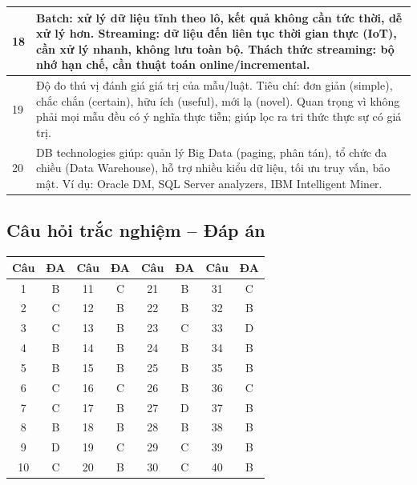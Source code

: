 \documentclass[10pt]{article}
\begin{document}
\begin{singlespace}
\begin{longtable}{|p{}|p{}|}
18 & Batch: xử lý dữ liệu tĩnh theo lô, kết quả không cần tức thời, dễ xử lý hơn. Streaming: dữ liệu đến liên tục thời gian thực (IoT), cần xử lý nhanh, không lưu toàn bộ. Thách thức streaming: bộ nhớ hạn chế, cần thuật toán online/incremental. \\
\hline
19 & Độ đo thú vị đánh giá giá trị của mẫu/luật. Tiêu chí: đơn giản (simple), chắc chắn (certain), hữu ích (useful), mới lạ (novel). Quan trọng vì không phải mọi mẫu đều có ý nghĩa thực tiễn; giúp lọc ra tri thức thực sự có giá trị. \\
\hline
20 & DB technologies giúp: quản lý Big Data (paging, phân tán), tổ chức đa chiều (Data Warehouse), hỗ trợ nhiều kiểu dữ liệu, tối ưu truy vấn, bảo mật. Ví dụ: Oracle DM, SQL Server analyzers, IBM Intelligent Miner. \\
\hline
\end{longtable}
\end{singlespace}

\subsection*{Câu hỏi trắc nghiệm -- Đáp án}

\begin{singlespace}
\begin{longtable}{|c|c||c|c||c|c||c|c|}
\hline
\textbf{Câu} & \textbf{ĐA} & \textbf{Câu} & \textbf{ĐA} & \textbf{Câu} & \textbf{ĐA} & \textbf{Câu} & \textbf{ĐA} \\
\hline
\endhead
1 & B & 11 & C & 21 & B & 31 & C \\
\hline
2 & C & 12 & B & 22 & B & 32 & B \\
\hline
3 & C & 13 & B & 23 & C & 33 & D \\
\hline
4 & B & 14 & B & 24 & B & 34 & B \\
\hline
5 & B & 15 & B & 25 & B & 35 & B \\
\hline
6 & C & 16 & C & 26 & B & 36 & C \\
\hline
7 & C & 17 & B & 27 & D & 37 & B \\
\hline
8 & B & 18 & B & 28 & B & 38 & B \\
\hline
9 & D & 19 & C & 29 & C & 39 & B \\
\hline
10 & C & 20 & B & 30 & C & 40 & B \\
\hline
\end{longtable}
\end{singlespace}
\end{document}
